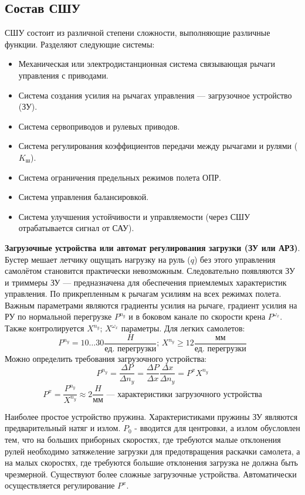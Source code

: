 \documentclass{article}
\begin{document}
\subsection{Состав СШУ}
СШУ состоит из различной степени сложности, выполняющие различные функции.
Разделяют следующие системы:
\begin{itemize}
    \item Механическая или электродистанционная система связывающая рычаги
        управления с приводами.
    \item Система создания усилия на рычагах управления --- загрузочное
        устройство (ЗУ).
    \item Система сервоприводов и рулевых приводов.
    \item Система регулирования коэффициентов передачи между рычагами и рулями
        ($K_\text{ш}$).
    \item Система ограничения предельных режимов полета ОПР.
    \item Система управления балансировкой.
    \item Система улучшения устойчивости и управляемости (через СШУ
        отрабатывается сигнал от САУ).
\end{itemize}
\textbf{Загрузочные устройства или автомат регулирования загрузки (ЗУ или
АРЗ)}. Бустер мешает летчику ощущать нагрузку на руль ($q$) без этого
управления самолётом становится практически невозможным. Следовательно
появляются ЗУ и триммеры
ЗУ --- предназначена для обеспечения приемлемых характеристик управления. По
прикрепленным к рычагам усилиям на всех режимах полета. Важным параметрами
являются градиенты усилия на рычаге, градиент усилия на РУ по нормальной
перегрузке $P^{n_y}$ и в боковом канале по скорости крена $P^{\omega_x}$. Также
контролируется $X^{n_y}; \, X^{\omega_x}$ параметры. Для легких самолетов:
\[
    P^{n_y} =10 \dots 30 \frac{H}{\text{ед. перегрузки}}; \, X^{n_y} \ge 12
    \frac{\text{мм}}{\text{ед. перегрузки}}
\]
Можно определить требования загрузочного устройства:
\[
    P^{n_y} = \frac{\Delta P}{\Delta n_y} = \frac{\Delta P}{\Delta x}
    \frac{\Delta x}{\Delta n_y} = P^{x} X^{n_y}
\]
\[
    P^{x} = \frac{P^{n_y}}{X^{n_y}} \approx 2 \frac{H}{\text{мм}} \text{ ---
    характеристики загрузочного устройства}
\]

Наиболее простое устройство пружина.
Характеристиками пружины ЗУ являются предварительный натяг и излом. $P_0$ -
вводится для центровки, а излом обусловлен тем, что на больших приборных
скоростях, где требуются малые отклонения рулей необходимо затяжеление загрузки
для предотвращения раскачки самолета, а на малых скоростях, где требуются
большие отклонения загрузка не должна быть чрезмерной. Существуют более сложные
загрузочные устройства. Автоматически осуществляется регулирование $P^{x}$.
\end{document}
